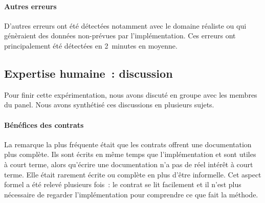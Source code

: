 \paragraph{Autres erreurs} D'autres erreurs ont été détectées notamment avec le
domaine réaliste  ou  qui génèraient des données
non-prévues par l'implémentation. Ces erreurs ont principalement été détectées
en 2~minutes en moyenne.

\subsection{Expertise humaine~: discussion}
\label{subsection:experimentation:discuss}

%
%
%
%
%

Pour finir cette expérimentation, nous avons discuté en groupe avec les membres
du panel. Nous avons synthétisé ces discussions en plusieurs sujets.

\paragraph{Bénéfices des contrats} La remarque la plus fréquente était que les
con\-trats offrent une documentation plus complète. Ils sont écrits en même
temps que l'implémentation et sont utiles à court terme, alors qu'écrire une
documentation n'a pas de réel intérêt à court terme. Elle était rarement
écrite ou complète en plus d'être informelle. Cet aspect formel a été relevé
plusieurs fois~: le contrat se lit facilement et il n'est plus nécessaire de
regarder l'implémentation pour comprendre ce que fait la méthode.

